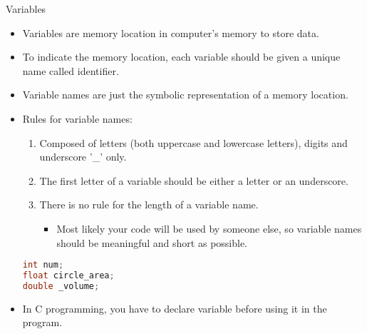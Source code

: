 \documentclass[10pt,t]{beamer}
\begin{document}
\begin{frame}[fragile]{Variables}
  \begin{itemize}
    \item Variables are memory location in computer's memory to store data.
    \item To indicate the memory location, each variable should be given a unique name called identifier. 
    \item Variable names are just the symbolic representation of a memory location.
    \item Rules for variable names:
    \begin{enumerate}
      \item Composed of letters (both uppercase and lowercase letters), digits and underscore '\_' only.
      \item The first letter of a variable should be either a letter or an underscore.
      \item There is no rule for the length of a variable name.
      \begin{itemize}
        \item Most likely your code will be used by someone else, so variable names should be meaningful and short as possible.
      \end{itemize}
    \end{enumerate}
    \begin{lstlisting}[language=C,basicstyle=\scriptsize\ttfamily]
int num;
float circle_area;
double _volume;
    \end{lstlisting}
    \item In C programming, you have to declare variable before using it in the program.
  \end{itemize}
\end{frame}
\end{document}
